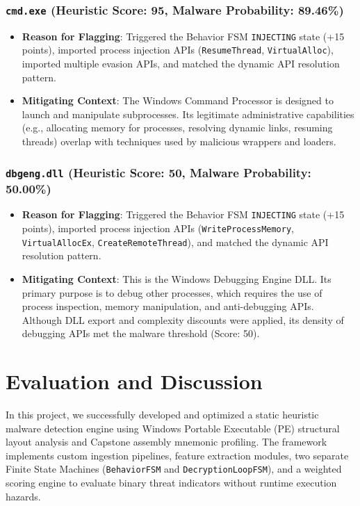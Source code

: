 \documentclass[11pt,a4paper]{article}
\begin{document}
\subsubsection{\texttt{cmd.exe} (Heuristic Score: 95, Malware Probability: 89.46\%)}
\begin{itemize}
    \item \textbf{Reason for Flagging}: Triggered the Behavior FSM \texttt{INJECTING} state (+15 points), imported process injection APIs (\texttt{ResumeThread}, \texttt{VirtualAlloc}), imported multiple evasion APIs, and matched the dynamic API resolution pattern.
    \item \textbf{Mitigating Context}: The Windows Command Processor is designed to launch and manipulate subprocesses. Its legitimate administrative capabilities (e.g., allocating memory for processes, resolving dynamic links, resuming threads) overlap with techniques used by malicious wrappers and loaders.
\end{itemize}

\subsubsection{\texttt{dbgeng.dll} (Heuristic Score: 50, Malware Probability: 50.00\%)}
\begin{itemize}
    \item \textbf{Reason for Flagging}: Triggered the Behavior FSM \texttt{INJECTING} state (+15 points), imported process injection APIs (\texttt{WriteProcessMemory}, \texttt{VirtualAllocEx}, \texttt{CreateRemoteThread}), and matched the dynamic API resolution pattern.
    \item \textbf{Mitigating Context}: This is the Windows Debugging Engine DLL. Its primary purpose is to debug other processes, which requires the use of process inspection, memory manipulation, and anti-debugging APIs. Although DLL export and complexity discounts were applied, its density of debugging APIs met the malware threshold (Score: 50).
\end{itemize}


\section{Evaluation and Discussion}

In this project, we successfully developed and optimized a static heuristic malware detection engine using Windows Portable Executable (PE) structural layout analysis and Capstone assembly mnemonic profiling. The framework implements custom ingestion pipelines, feature extraction modules, two separate Finite State Machines (\texttt{BehaviorFSM} and \texttt{DecryptionLoopFSM}), and a weighted scoring engine to evaluate binary threat indicators without runtime execution hazards.
\end{document}
